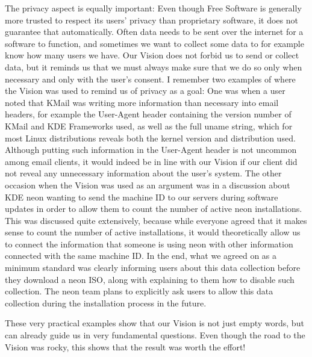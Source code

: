 The privacy aspect is equally important: Even though Free Software is generally more trusted to respect its users' privacy than proprietary software, it does not guarantee that automatically. Often data needs to be sent over the internet for a software to function, and sometimes we want to collect some data to for example know how many users we have. Our Vision does not forbid us to send or collect data, but it reminds us that we must always make sure that we do so only when necessary and only with the user's consent. I remember two examples of where the Vision was used to remind us of privacy as a goal: One was when a user noted that KMail was writing more information than necessary into email headers, for example the User-Agent header containing the version number of KMail and KDE Frameworks used, as well as the full uname string, which for most Linux distributions reveals both the kernel version and distribution used. Although putting such information in the User-Agent header is not uncommon among email clients, it would indeed be in line with our Vision if our client did not reveal any unnecessary information about the user's system. The other occasion when the Vision was used as an argument was in a discussion about KDE neon wanting to send the machine ID to our servers during software updates in order to allow them to count the number of active neon installations. This was discussed quite extensively, because while everyone agreed that it makes sense to count the number of active installations, it would theoretically allow us to connect the information that someone is using neon with other information connected with the same machine ID. In the end, what we agreed on as a minimum standard was clearly informing users about this data collection before they download a neon ISO, along with explaining to them how to disable such collection. The neon team plans to explicitly ask users to allow this data collection during the installation process in the future.

These very practical examples show that our Vision is not just empty words, but can already guide us in very fundamental questions. Even though the road to the Vision was rocky, this shows that the result was worth the effort!
